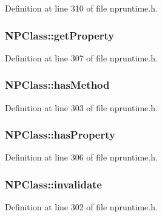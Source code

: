Definition at line 310 of file npruntime.h.

\hypertarget{struct_n_p_class_a0f9451c93e48b9be7db5f49a1703ac09}{
\subsubsection[{getProperty}]{ {\bf NPClass::getProperty}}}
\label{struct_n_p_class_a0f9451c93e48b9be7db5f49a1703ac09}


Definition at line 307 of file npruntime.h.

\hypertarget{struct_n_p_class_aa59d4bb55b6a5635a1adf5258209dd8b}{
\subsubsection[{hasMethod}]{ {\bf NPClass::hasMethod}}}
\label{struct_n_p_class_aa59d4bb55b6a5635a1adf5258209dd8b}


Definition at line 303 of file npruntime.h.

\hypertarget{struct_n_p_class_a8a0d2cfeacb08cfd00f166ca3a5ae12d}{
\subsubsection[{hasProperty}]{ {\bf NPClass::hasProperty}}}
\label{struct_n_p_class_a8a0d2cfeacb08cfd00f166ca3a5ae12d}


Definition at line 306 of file npruntime.h.

\hypertarget{struct_n_p_class_ac4475babe4b741353aef2b9edc876c17}{
\subsubsection[{invalidate}]{ {\bf NPClass::invalidate}}}
\label{struct_n_p_class_ac4475babe4b741353aef2b9edc876c17}


Definition at line 302 of file npruntime.h.

